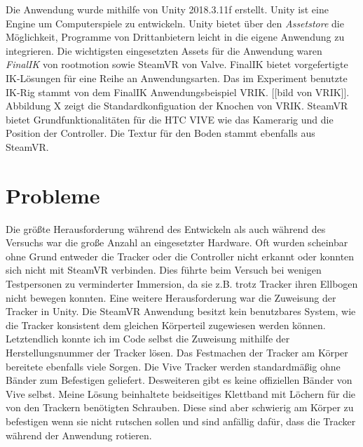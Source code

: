 Die Anwendung wurde mithilfe von Unity 2018.3.11f erstellt. Unity ist eine Engine um Computerspiele zu entwickeln. Unity bietet über den \textit{Assetstore} die Möglichkeit, Programme von Drittanbietern leicht in die eigene Anwendung zu integrieren. Die wichtigsten eingesetzten Assets für die Anwendung waren \textit{FinalIK} von rootmotion\cite{rootmotion} sowie SteamVR von Valve. FinalIK bietet vorgefertigte IK-Lösungen für eine Reihe an Anwendungsarten. Das im Experiment benutzte IK-Rig stammt von dem FinalIK Anwendungsbeispiel VRIK. [[bild von VRIK]]. Abbildung X zeigt die Standardkonfiguation der Knochen von VRIK. SteamVR bietet Grundfunktionalitäten für die HTC VIVE wie das Kamerarig und die Position der Controller. Die Textur für den Boden stammt ebenfalls aus SteamVR.


\section{Probleme}
Die größte Herausforderung während des Entwickeln als auch während des Versuchs war die große Anzahl an eingesetzter Hardware. Oft wurden scheinbar ohne Grund entweder die Tracker oder die Controller nicht erkannt oder konnten sich nicht mit SteamVR verbinden. Dies führte beim Versuch bei wenigen Testpersonen zu verminderter Immersion, da sie z.B. trotz Tracker ihren Ellbogen nicht bewegen konnten. 
Eine weitere Herausforderung war die Zuweisung der Tracker in Unity. Die SteamVR Anwendung besitzt kein benutzbares System, wie die Tracker konsistent dem gleichen Körperteil zugewiesen werden können. Letztendlich konnte ich im Code selbst die Zuweisung mithilfe der Herstellungsnummer der Tracker lösen.
Das Festmachen der Tracker am Körper bereitete ebenfalls viele Sorgen. Die Vive Tracker werden standardmäßig ohne Bänder zum Befestigen geliefert. Desweiteren gibt es keine offiziellen Bänder von Vive selbst. Meine Lösung beinhaltete beidseitiges Klettband mit Löchern für die von den Trackern benötigten Schrauben. Diese sind aber schwierig am Körper zu befestigen wenn sie nicht rutschen sollen und sind anfällig dafür, dass die Tracker während der Anwendung rotieren.
 
